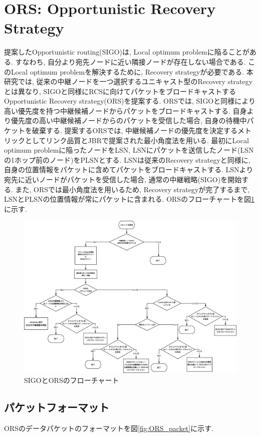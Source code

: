 \documentclass[10pt]{jreport}
\begin{document}
\section{ORS: Opportunistic Recovery Strategy}
提案したOpportunistic routing(SIGO)は, Local optimum problemに陥ることがある. すなわち, 自分より宛先ノードに近い隣接ノードが存在しない場合である. このLocal optimum problemを解決するために, Recovery strategyが必要である. 本研究では, 従来の中継ノードを一つ選択するユニキャスト型のRecovery strategyとは異なり, SIGOと同様にRCSに向けてパケットをブロードキャストするOpportunistic Recovery strategy(ORS)を提案する. ORSでは, SIGOと同様により高い優先度を持つ中継候補ノードからパケットをブロードキャストする. 自身より優先度の高い中継候補ノードからのパケットを受信した場合, 自身の待機中パケットを破棄する. 提案するORSでは, 中継候補ノードの優先度を決定するメトリックとしてリンク品質とJBRで提案された最小角度法を用いる. 最初にLocal optimum problemに陥ったノードをLSN, LSNにパケットを送信したノード(LSNの1ホップ前のノード)をPLSNとする. LSNは従来のRecovery strategyと同様に, 自身の位置情報をパケットに含めてパケットをブロードキャストする. LSNより宛先に近いノードがパケットを受信した場合, 通常の中継戦略(SIGO)を開始する. また, ORSでは最小角度法を用いるため, Recovery strategyが完了するまで, LSNとPLSNの位置情報が常にパケットに含まれる.
ORSのフローチャートを図\ref{fig:ORS}に示す.

\begin{figure}[!ht]
	\centering
	\includegraphics[width=170mm]{figures/ORS.eps}
	\caption{SIGOとORSのフローチャート}
	\label{fig:ORS}
\end{figure}

\subsection{パケットフォーマット}
ORSのデータパケットのフォーマットを図\ref{fig:ORS_packet}に示す.
\end{document}
